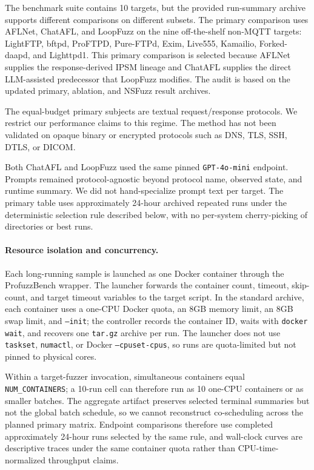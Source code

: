 \documentclass[final,5p,times,number]{elsarticle}
\begin{document}
The benchmark suite contains 10 targets, but the provided run-summary archive supports different comparisons on different subsets. The primary comparison uses AFLNet, ChatAFL, and LoopFuzz on the nine off-the-shelf non-MQTT targets: LightFTP, bftpd, ProFTPD, Pure-FTPd, Exim, Live555, Kamailio, Forked-daapd, and Lighttpd1. This primary comparison is selected because AFLNet supplies the response-derived IPSM lineage and ChatAFL supplies the direct LLM-assisted predecessor that LoopFuzz modifies. The audit is based on the updated primary, ablation, and NSFuzz result archives.

The equal-budget primary subjects are textual request/response protocols. We restrict our performance claims to this regime. The method has not been validated on opaque binary or encrypted protocols such as DNS, TLS, SSH, DTLS, or DICOM.

Both ChatAFL and LoopFuzz used the same pinned \texttt{GPT-4o-mini} endpoint. Prompts remained protocol-agnostic beyond protocol name, observed state, and runtime summary. We did not hand-specialize prompt text per target. The primary table uses approximately 24-hour archived repeated runs under the deterministic selection rule described below, with no per-system cherry-picking of directories or best runs.

\paragraph{Resource isolation and concurrency.}
Each long-running sample is launched as one Docker container through the ProfuzzBench wrapper. The launcher forwards the container count, timeout, skip-count, and target timeout variables to the target script. In the standard archive, each container uses a one-CPU Docker quota, an 8GB memory limit, an 8GB swap limit, and \texttt{--init}; the controller records the container ID, waits with \texttt{docker wait}, and recovers one \texttt{tar.gz} archive per run. The launcher does not use \texttt{taskset}, \texttt{numactl}, or Docker \texttt{--cpuset-cpus}, so runs are quota-limited but not pinned to physical cores.

Within a target-fuzzer invocation, simultaneous containers equal \texttt{NUM\_CONTAINERS}; a 10-run cell can therefore run as 10 one-CPU containers or as smaller batches. The aggregate artifact preserves selected terminal summaries but not the global batch schedule, so we cannot reconstruct co-scheduling across the planned primary matrix. Endpoint comparisons therefore use completed approximately 24-hour runs selected by the same rule, and wall-clock curves are descriptive traces under the same container quota rather than CPU-time-normalized throughput claims.
\end{document}
